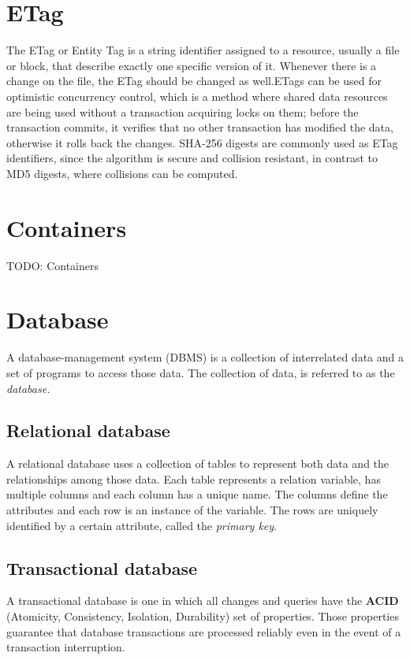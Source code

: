 \section{ETag}
  The ETag or Entity Tag is a string identifier assigned to a resource, usually a file or block, that describe exactly one specific version of it. Whenever there is a change on the file, the ETag should be changed as well.ETags can be used for optimistic concurrency control\cite{concurrency-control}, which is a method where shared data resources are being used without a transaction acquiring locks on them; before the transaction commits, it verifies that no other transaction has modified the data, otherwise it rolls back the changes. SHA-256 digests are commonly used as ETag identifiers, since the algorithm is secure and collision resistant, in contrast to MD5 digests, where collisions can be computed.

\section{Containers}
  TODO: Containers

\section{Database}
  A database-management system (DBMS) \cite{dbms-sil} is a collection of interrelated data and a set of programs to access those data. The collection of data, is referred to as the \emph{database.}

  \subsection{Relational database}
    A relational database uses a collection of tables to represent both data and the relationships among those data. Each table represents a relation variable, has multiple columns and each column has a unique name. The columns define the attributes and each row is an instance of the variable. The rows are uniquely identified by a certain attribute, called the \emph{primary key}.

  \subsection{Transactional database}
    A transactional database is one in which all changes and queries have the \textbf{ACID} \cite{acid} (Atomicity, Consistency, Isolation, Durability) set of properties. Those properties guarantee that database transactions are processed reliably even in the event of a transaction interruption.

